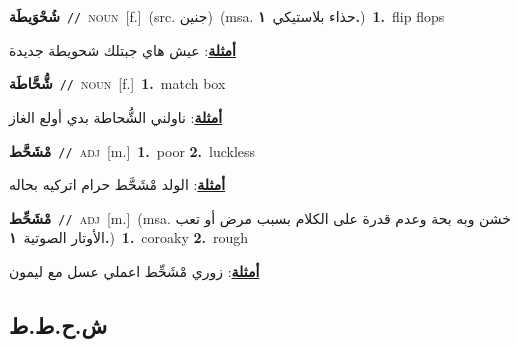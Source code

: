 \documentclass[10pt,a4paper,twoside]{article} %
\begin{document}
\begin{multicols}{2}
{\setlength\topsep{0pt}\textbf{\foreignlanguage{arabic}{شُحْوَيطَة}}\ {\color{gray}\texttt{//}\color{black}}\ \textsc{noun}\ [f.]\ (src. \color{gray}\foreignlanguage{arabic}{جنين}\color{black})\ \color{gray}(msa. \foreignlanguage{arabic}{حذاء بلاستيكي}~\foreignlanguage{arabic}{\textbf{١.}})\color{black}\ \textbf{1.}~flip flops\  \begin{flushright}\color{gray}\foreignlanguage{arabic}{\textbf{\underline{\foreignlanguage{arabic}{أمثلة}}}: عيش هاي جبتلك شحويطة جديدة}\end{flushright}\color{black}} \vspace{2mm}

{\setlength\topsep{0pt}\textbf{\foreignlanguage{arabic}{شُّحَّاطَة}}\ {\color{gray}\texttt{//}\color{black}}\ \textsc{noun}\ [f.]\ \textbf{1.}~match box\  \begin{flushright}\color{gray}\foreignlanguage{arabic}{\textbf{\underline{\foreignlanguage{arabic}{أمثلة}}}: ناولني الشُّحاطة بدي أولع الغاز}\end{flushright}\color{black}} \vspace{2mm}

{\setlength\topsep{0pt}\textbf{\foreignlanguage{arabic}{مْشَحَّط}}\ {\color{gray}\texttt{//}\color{black}}\ \textsc{adj}\ [m.]\ \textbf{1.}~poor  \textbf{2.}~luckless\  \begin{flushright}\color{gray}\foreignlanguage{arabic}{\textbf{\underline{\foreignlanguage{arabic}{أمثلة}}}: الولد مْشَحَّط حرام اتركيه بحاله}\end{flushright}\color{black}} \vspace{2mm}

{\setlength\topsep{0pt}\textbf{\foreignlanguage{arabic}{مْشَحِّط}}\ {\color{gray}\texttt{//}\color{black}}\ \textsc{adj}\ [m.]\ \color{gray}(msa. \foreignlanguage{arabic}{خشن وبه بحة وعدم قدرة على الكلام بسبب مرض أو تعب الأوتار الصوتية}~\foreignlanguage{arabic}{\textbf{١.}})\color{black}\ \textbf{1.}~coroaky  \textbf{2.}~rough\  \begin{flushright}\color{gray}\foreignlanguage{arabic}{\textbf{\underline{\foreignlanguage{arabic}{أمثلة}}}: زوري مْشَحِّط اعملي عسل مع ليمون}\end{flushright}\color{black}} \vspace{2mm}

\vspace{-3mm}
\subsection*{\color{blue}\foreignlanguage{arabic}{ش.ح.ط.ط}\color{blue}{}} 


\end{multicols}
\end{document}
